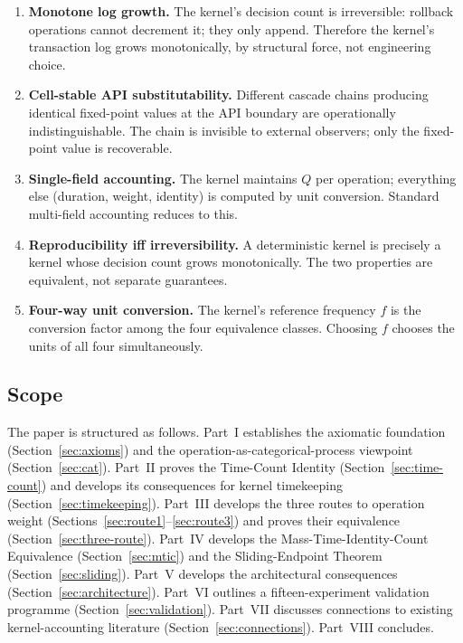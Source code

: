 \documentclass[twocolumn,11pt,a4paper]{article}
\newcommand{\Qweight}{Q}
\begin{document}
\begin{enumerate}[nosep,leftmargin=*]
\item \textbf{Monotone log growth.} The kernel's decision count is irreversible: rollback operations cannot decrement it; they only append. Therefore the kernel's transaction log grows monotonically, by structural force, not engineering choice.
\item \textbf{Cell-stable API substitutability.} Different cascade chains producing identical fixed-point values at the API boundary are operationally indistinguishable. The chain is invisible to external observers; only the fixed-point value is recoverable.
\item \textbf{Single-field accounting.} The kernel maintains $\Qweight$ per operation; everything else (duration, weight, identity) is computed by unit conversion. Standard multi-field accounting reduces to this.
\item \textbf{Reproducibility iff irreversibility.} A deterministic kernel is precisely a kernel whose decision count grows monotonically. The two properties are equivalent, not separate guarantees.
\item \textbf{Four-way unit conversion.} The kernel's reference frequency $f$ is the conversion factor among the four equivalence classes. Choosing $f$ chooses the units of all four simultaneously.
\end{enumerate}

\subsection{Scope}

The paper is structured as follows. Part~I establishes the axiomatic foundation (Section~\ref{sec:axioms}) and the operation-as-categorical-process viewpoint (Section~\ref{sec:cat}). Part~II proves the Time-Count Identity (Section~\ref{sec:time-count}) and develops its consequences for kernel timekeeping (Section~\ref{sec:timekeeping}). Part~III develops the three routes to operation weight (Sections~\ref{sec:route1}--\ref{sec:route3}) and proves their equivalence (Section~\ref{sec:three-route}). Part~IV develops the Mass-Time-Identity-Count Equivalence (Section~\ref{sec:mtic}) and the Sliding-Endpoint Theorem (Section~\ref{sec:sliding}). Part~V develops the architectural consequences (Section~\ref{sec:architecture}). Part~VI outlines a fifteen-experiment validation programme (Section~\ref{sec:validation}). Part~VII discusses connections to existing kernel-accounting literature (Section~\ref{sec:connections}). Part~VIII concludes.
\end{document}

